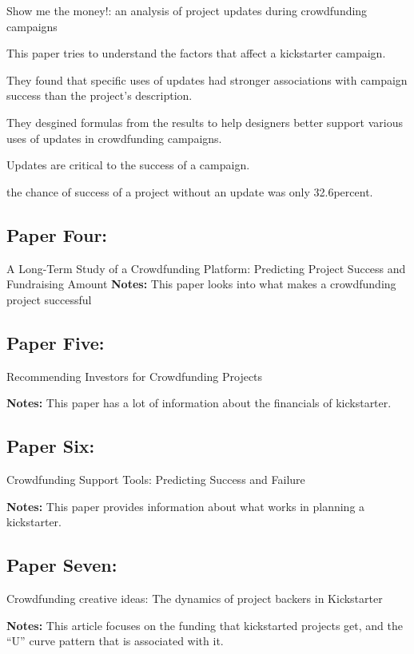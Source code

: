 \documentclass{scrartcl}
\begin{document}
Show me the money!: an analysis of project updates during crowdfunding campaigns
\cite{xu2014show}

This paper tries to understand the factors that affect a kickstarter campaign.

They found that specific uses of updates had stronger associations with campaign success than the project’s description.

They desgined formulas from the results to help designers better support various uses of updates in crowdfunding campaigns.

Updates are critical to the success of a campaign.

the chance of success of a project without an update was only 32.6percent.

\subsection{Paper Four:}

A Long-Term Study of a Crowdfunding Platform: Predicting Project Success and Fundraising Amount
\cite{Chung:2015}
\textbf{Notes:}
This paper looks into what makes a crowdfunding project successful

\subsection{Paper Five:}

Recommending Investors for Crowdfunding Projects
\cite{An:2014}

\textbf{Notes:}
This paper has a lot of information about the financials of kickstarter.

\subsection{Paper Six:}

Crowdfunding Support Tools: Predicting Success and Failure
\cite{Greenberg:2013}

\textbf{Notes:}
This paper provides information about what works in planning a kickstarter. 

\subsection{Paper Seven:}
Crowdfunding creative ideas: The dynamics of project backers in Kickstarter
\cite{kuppuswamy2015}

\textbf{Notes:}
This article focuses on the funding that kickstarted projects get, and the ``U'' curve pattern that is associated with it.
\end{document}
